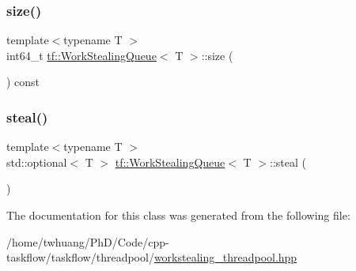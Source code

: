 \mbox{\label{classtf_1_1WorkStealingQueue_aada5323cb64e23796df418c5be124b29}} 
\subsubsection{\texorpdfstring{size()}{size()}}
{\footnotesize\ttfamily template$<$typename T $>$ \\
int64\+\_\+t \hyperlink{classtf_1_1WorkStealingQueue}{tf\+::\+Work\+Stealing\+Queue}$<$ T $>$\+::size (\begin{DoxyParamCaption}{ }\end{DoxyParamCaption}) const\hspace{0.3cm}{\ttfamily [noexcept]}}

\mbox{\label{classtf_1_1WorkStealingQueue_a6b63dca550a2f576b92f05bdc2e03a74}} 
\subsubsection{\texorpdfstring{steal()}{steal()}}
{\footnotesize\ttfamily template$<$typename T $>$ \\
std\+::optional$<$ T $>$ \hyperlink{classtf_1_1WorkStealingQueue}{tf\+::\+Work\+Stealing\+Queue}$<$ T $>$\+::steal (\begin{DoxyParamCaption}{ }\end{DoxyParamCaption})}



The documentation for this class was generated from the following file\+:\begin{DoxyCompactItemize}
\item 
/home/twhuang/\+Ph\+D/\+Code/cpp-\/taskflow/taskflow/threadpool/\hyperlink{workstealing__threadpool_8hpp}{workstealing\+\_\+threadpool.\+hpp}\end{DoxyCompactItemize}
